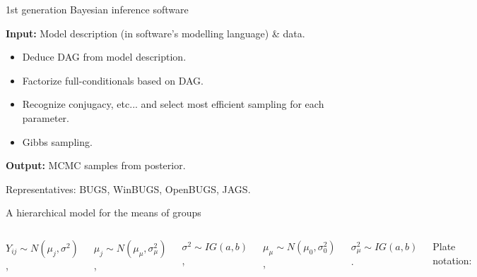 \begin{frame}{1st generation Bayesian inference software}

\bigskip

\textbf{Input: }Model description (in software's modelling language) \& data.

\bigskip

\begin{itemize}\itemsep1.1em
\item Deduce DAG from model description.
\item Factorize full-conditionals based on DAG.
\item Recognize conjugacy, etc... and select most efficient sampling for each parameter.
\item Gibbs sampling.
\end{itemize}

\bigskip

\textbf{Output:} MCMC samples from posterior.

\bigskip

Representatives: BUGS, WinBUGS, OpenBUGS, JAGS.

\end{frame}

\begin{frame}{A hierarchical model for the means of groups}
\smallskip

\begin{columns}[c]
\centering
{}
$ Y_{ij} \sim N(\mu_j, \sigma^2)$, 

$ \mu_j \sim N(\mu_{\mu}, \sigma_{\mu}^2)$, 

$ \sigma^2 \sim IG(a, b)$,

$ \mu_{\mu} \sim N(\mu_0, \sigma^2_0)$, 

$ \sigma_{\mu}^2 \sim IG(a,b)$.


Plate notation:

\begin{center}
\end{center}
\end{columns}
\end{frame}


